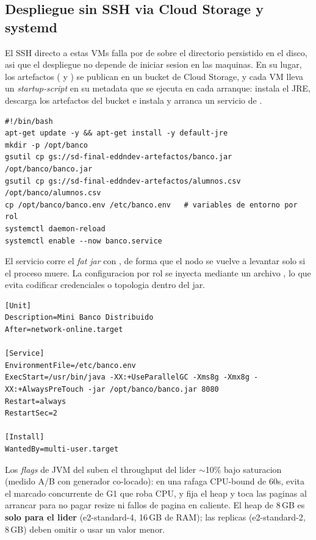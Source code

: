 \subsection{Despliegue sin SSH via Cloud Storage y systemd}

El SSH directo a estas VMs falla por  de  sobre
el directorio  persistido en el disco, asi que el despliegue no
depende de iniciar sesion en las maquinas. En su lugar, los artefactos
( y ) se publican en un bucket de Cloud
Storage, y cada VM lleva un \emph{startup-script} en su metadata que se ejecuta
en cada arranque: instala el JRE, descarga los artefactos del bucket e instala y
arranca un servicio de .

\begin{lstlisting}[language=none,caption={Startup-script en metadata: JRE, artefactos y servicio.}]
#!/bin/bash
apt-get update -y && apt-get install -y default-jre
mkdir -p /opt/banco
gsutil cp gs://sd-final-eddndev-artefactos/banco.jar    /opt/banco/banco.jar
gsutil cp gs://sd-final-eddndev-artefactos/alumnos.csv  /opt/banco/alumnos.csv
cp /opt/banco/banco.env /etc/banco.env   # variables de entorno por rol
systemctl daemon-reload
systemctl enable --now banco.service
\end{lstlisting}

El servicio  corre el \emph{fat jar} con
, de forma que el nodo se vuelve a levantar solo si el
proceso muere. La configuracion por rol se inyecta mediante un archivo
, lo que evita codificar credenciales o topologia dentro
del jar.

\begin{lstlisting}[language=none,caption={Unidad systemd banco.service (Restart=always, puerto 8080).}]
[Unit]
Description=Mini Banco Distribuido
After=network-online.target

[Service]
EnvironmentFile=/etc/banco.env
ExecStart=/usr/bin/java -XX:+UseParallelGC -Xms8g -Xmx8g -XX:+AlwaysPreTouch -jar /opt/banco/banco.jar 8080
Restart=always
RestartSec=2

[Install]
WantedBy=multi-user.target
\end{lstlisting}

\begin{nota}
Los \emph{flags} de JVM del  suben el throughput del lider
$\sim$10\% bajo saturacion (medido A/B con generador co-locado): en una rafaga
CPU-bound de 60s,  evita el marcado concurrente de G1 que
roba CPU, y  fija el heap y toca las
paginas al arrancar para no pagar resize ni fallos de pagina en caliente. El
heap de 8\,GB es \textbf{solo para el lider} (e2-standard-4, 16\,GB de RAM); las
replicas (e2-standard-2, 8\,GB) deben omitir  o usar un valor
menor.
\end{nota}

